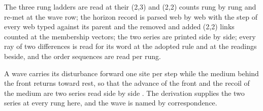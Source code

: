 The three rung ladders are read at their (2,3) and (2,2) counts rung by rung and re-met at the wave row; the horizon record is parsed web by web with the step of every web typed against its parent and the removed and added (2,2) links counted at the membership vectors; the two series are printed side by side; every ray of two differences is read for its word at the adopted rule and at the readings beside, and the order sequences are read per rung.

\begin{chbridge}
A wave carries its disturbance forward one site per step while the medium behind the front returns toward rest, so that the advance of the front and the recoil of the medium are two series read side by side \cite{Brillouin1946,Feynman1963}. The derivation supplies the two series at every rung here, and the wave is named by correspondence.
\end{chbridge}
